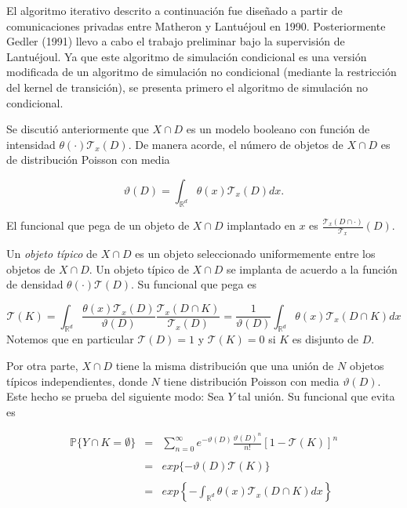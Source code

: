 El algoritmo iterativo descrito a continuaci\'on fue dise\~nado a partir de comunicaciones privadas entre Matheron y Lantu\'ejoul en 1990. Posteriormente Gedler (1991) llevo a cabo el trabajo preliminar bajo la supervisi\'on de Lantu\'ejoul. Ya que este algoritmo de simulaci\'on condicional es una versi\'on modificada de un algoritmo de simulaci\'on no condicional (mediante la restricci\'on del kernel de transici\'on), se presenta primero el algoritmo de simulaci\'on no condicional.

Se discuti\'o anteriormente que $X\cap D$ es un modelo booleano con funci\'on de intensidad $\theta(\cdot)\mathcal{T}_x(D)$. De manera acorde, el n\'umero de objetos de $X\cap D$ es de distribuci\'on Poisson con media

\[\vartheta(D)=\int_{\mathbb{R}^d}\theta(x)\mathcal{T}_x(D)dx.\]

El funcional que pega de un objeto de $X\cap D$ implantado en $x$ es $\frac{\mathcal{T}_x(D\cap\cdot)}{\mathcal{T}_x}(D)$.

Un \textit{objeto t\'ipico} de $X\cap D$ es un objeto seleccionado uniformemente entre los objetos de $X\cap D$. Un objeto t\'ipico de $X\cap D$ se implanta de acuerdo a la funci\'on de densidad $\theta(\cdot)\mathcal{T}(D)$.  Su funcional que pega es

\[\mathcal{T}(K)=\int_{\mathbb{R}^d}\frac{\theta(x)\mathcal{T}_x(D)}{\vartheta(D)}\frac{\mathcal{T}_x(D\cap K)}{\mathcal{T}_x(D)}=\frac{1}{\vartheta(D)}\int_{\mathbb{R}^d}\theta(x)\mathcal{T}_x(D\cap K)dx\]
\vspace{0.1in}
Notemos que en particular $\mathcal{T}(D)=1$ y $\mathcal{T}(K)=0$ si $K$ es disjunto de $D$.

Por otra parte, $X\cap D$ tiene la misma distribuci\'on que una uni\'on de $N$ objetos t\'ipicos independientes, donde $N$ tiene distribuci\'on Poisson con media $\vartheta(D)$. Este hecho se prueba del siguiente modo: Sea $Y$ tal uni\'on. Su funcional que evita es

\[\begin{array}{ccl}\mathbb{P}\{Y\cap K=\emptyset\}&=&\sum_{n=0}^\infty e^{-\vartheta(D)}\frac{\vartheta(D)^n}{n!}[1-\mathcal{T}(K)]^n\\
&&\\
&=&exp\{-\vartheta(D)\mathcal{T}(K)\}\\
&&\\
&=&exp\left\{-\int_{\mathbb{R}^d}\theta(x)\mathcal{T}_x(D\cap K)dx\right\}
\end{array}\]

